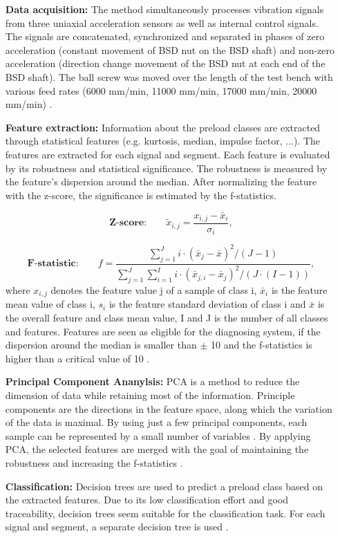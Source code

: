 \begin{itemize}
    \item [\textbf{Data acquisition:}] The method simultaneously processes vibration signals from three uniaxial acceleration sensors as well as internal control signals. The signals are concatenated, synchronized and separated in phases of zero acceleration (constant movement of BSD nut on the BSD shaft) and non-zero acceleration (direction change movement of the BSD nut at each end of the BSD shaft). The ball screw was moved over the length of the test bench with various feed rates (6000 mm/min, 11000 mm/min, 17000 mm/min, 20000 mm/min) \cite{Denkena2021}.
    \item [\textbf{Feature extraction:}] Information about the preload classes are extracted through statistical features (e.g. kurtosis, median, impulse factor, ...). The features are extracted for each signal and segment. Each feature is evaluated by its robustness and statistical significance. The robustness is measured by the feature's dispersion around the median. After normalizing the feature with the z-score, the significance is estimated by the f-statistics.
    
    \begin{equation}
        \textbf{Z-score:}\qquad \tilde{x}_{i,j} = \frac{x_{i,j} - \bar x_{i}}{\sigma_{i}},
    \end{equation}
    
    \begin{equation}
        \textbf{F-statistic:}\qquad f = \frac{\sum_{j=1}^{J} i \cdot (\bar x_{j} -\bar x)^{2}/(J-1)}{\sum_{j=1}^{J} \sum_{i=1}^{I} i \cdot (\bar x_{j,i} -\bar x_{j})^{2}/(J \cdot (I-1))},
    \end{equation}
    where ${x}_{i,j}$ denotes the feature value j of a sample of class i, $\bar{x}_{i}$ is the feature mean value of class i, ${s}_{i}$ is the feature standard deviation of class i and $\bar{x}$ is the overall feature and class mean value, I and J is the number of all classes and features.  Features are seen as eligible for the diagnosing system, if the dispersion around the median is smaller than $\pm$ 10 and the f-statistics is higher than a critical value of 10 \cite{Denkena2021}. 
    
    \item [\textbf{Principal Component Ananylsis:}] 
    PCA is a method to reduce the dimension of data while retaining most of the information. Principle components are the directions in the feature space, along which the variation of the data is maximal. By using just a few principal components, each sample can be represented by a small number of variables \cite{Ringner2008}. By applying PCA, the selected features are merged with the goal of maintaining the robustness and increasing the f-statistics \cite{Denkena2021}.
    
    \item [\textbf{Classification:}] Decision trees are used to predict a preload class based on the extracted features. Due to its low classification effort and good traceability, decision trees seem suitable for the classification task. For each signal and segment, a separate decision tree is used \cite{Denkena2021}. 
\end{itemize}

